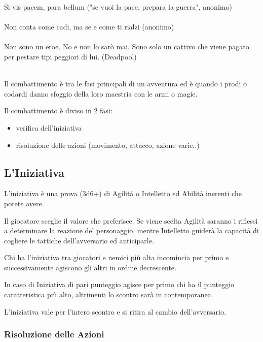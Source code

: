 \documentclass[a4paper,11pt,twoside,openany]{book}
\begin{document}
\label{combattimento}
\begin{tcolorbox}[enhanced,arc=5pt,boxrule=0.3pt]{
		Si vis pacem, para bellum ("se vuoi la pace, prepara la guerra", anonimo)\\\\
		Non conta come cadi, ma se e come ti rialzi (anonimo)\\\\
		Non sono un eroe. No e non lo sarò mai. Sono solo un cattivo che viene pagato per pestare tipi peggiori di lui. (Deadpool)\\\\
	}\end{tcolorbox}\medskip

Il combattimento è tra le fasi principali di un avventura ed è quando i prodi o codardi danno sfoggio della loro maestria con le armi o magie.

\bigskip

Il combattimento è diviso in 2 fasi:
\begin{itemize}
	\item verifica dell'iniziativa
	\item risoluzione delle azioni (movimento, attacco, azione varie..)
\end{itemize}

\subsection{L'Iniziativa}

\label{liniziativa}

L'iniziativa è una prova (3d6+) di Agilità o Intelletto ed Abilità inerenti che potete avere.

Il giocatore sceglie il valore che preferisce. Se viene scelta Agilità saranno i riflessi a determinare la reazione del personaggio, mentre Intelletto guiderà la capacità di cogliere le tattiche dell'avversario ed anticiparle.

Chi ha l'iniziativa tra giocatori e nemici più alta incomincia per primo e successivamente agiscono gli altri in ordine decrescente.

In caso di Iniziativa di pari punteggio agisce per primo chi ha il punteggio caratteristica più alto, altrimenti lo scontro sarà in contemporanea.

L'iniziativa vale per l'intero scontro e si ritira al cambio dell'avversario.

\subsubsection{Risoluzione delle Azioni}
\end{document}
